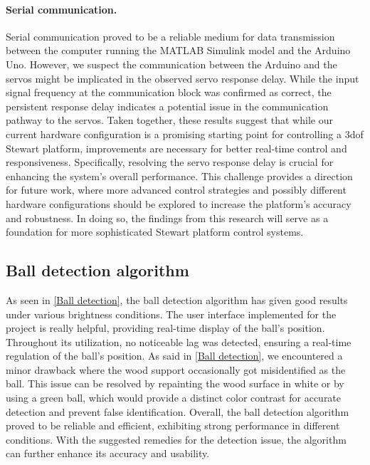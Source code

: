 \paragraph{Serial communication.}
Serial communication proved to be a reliable medium for data transmission between the computer running the MATLAB Simulink model and the Arduino Uno. However, we suspect the communication between the Arduino and the servos might be implicated in the observed servo response delay. While the input signal frequency at the communication block was confirmed as correct, the persistent response delay indicates a potential issue in the communication pathway to the servos.
\newline\newline
Taken together, these results suggest that while our current hardware configuration is a promising starting point for controlling a 3dof Stewart platform, improvements are necessary for better real-time control and responsiveness. Specifically, resolving the servo response delay is crucial for enhancing the system's overall performance. This challenge provides a direction for future work, where more advanced control strategies and possibly different hardware configurations should be explored to increase the platform's accuracy and robustness. In doing so, the findings from this research will serve as a foundation for more sophisticated Stewart platform control systems.

\subsection{Ball detection algorithm}\label{Ball discussion}
As seen in \ref{Ball detection}, the ball detection algorithm has given good results under various brightness conditions. The user interface implemented for the project is really helpful, providing real-time display of the
ball’s position. Throughout its utilization, no noticeable lag was detected, ensuring a real-time regulation of the ball’s position.\newline
As said in \ref{Ball detection}, we encountered a minor drawback where the wood support occasionally got misidentified as the ball. This issue can be resolved by repainting the wood surface in white or by using a green ball, which would provide a distinct color contrast for accurate detection and prevent false identification.\newline
Overall, the ball detection algorithm proved to be reliable and efficient, exhibiting strong performance in different conditions. With the suggested remedies for the detection issue, the algorithm can further enhance its accuracy and usability.

